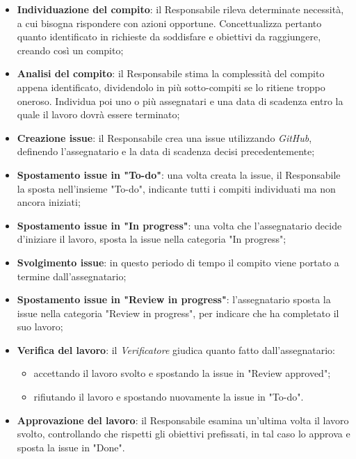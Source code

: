 \begin{itemize}
    \item \textbf{Individuazione del compito}: il Responsabile rileva determinate necessità, a cui bisogna rispondere con azioni opportune. Concettualizza pertanto quanto identificato in richieste da soddisfare e obiettivi da raggiungere, creando così un compito;

    \item \textbf{Analisi del compito}: il Responsabile stima la complessità del compito appena identificato, dividendolo in più sotto-compiti se lo ritiene troppo oneroso. Individua poi uno o più assegnatari e una data di scadenza entro la quale il lavoro dovrà essere terminato;
    \item \textbf{Creazione issue}: il Responsabile crea una issue utilizzando \textit{GitHub}, definendo l’assegnatario e la data di scadenza decisi precedentemente;
    \item \textbf{Spostamento issue in "To-do"}: una volta creata la issue, il Responsabile la sposta nell’insieme "To-do", indicante tutti i compiti individuati ma non ancora iniziati;
    \item \textbf{Spostamento issue in "In progress"}: una volta che l’assegnatario decide d'iniziare il lavoro, sposta la issue nella categoria "In progress";
    \item \textbf{Svolgimento issue}: in questo periodo di tempo il compito viene portato a termine dall'assegnatario;
    \item \textbf{Spostamento issue in "Review in progress"}: l’assegnatario sposta la issue nella categoria "Review in progress", per indicare che ha completato il suo lavoro;
    \item \textbf{Verifica del lavoro}: il \textit{Verificatore} giudica quanto fatto dall’assegnatario:

          \begin{itemize}
              \item accettando il lavoro svolto e spostando la issue in "Review approved";
              \item rifiutando il lavoro e spostando nuovamente la issue in "To-do".
          \end{itemize}

    \item \textbf{Approvazione del lavoro}: il Responsabile esamina un’ultima volta il lavoro svolto, controllando che rispetti gli obiettivi prefissati, in tal caso lo approva e sposta la issue in "Done".

\end{itemize}
